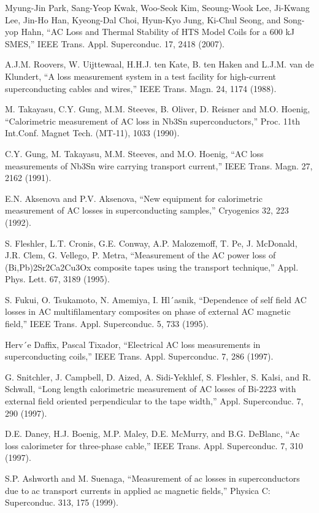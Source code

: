 \noindent [7.85] Myung-Jin Park, Sang-Yeop Kwak, Woo-Seok Kim, Seoung-Wook Lee, Ji-Kwang Lee, Jin-Ho Han, Kyeong-Dal Choi, Hyun-Kyo Jung, Ki-Chul Seong, and Song-yop Hahn,
 ``AC Loss and Thermal Stability of HTS Model Coils for a 600 kJ SMES,” IEEE Trans. Appl. Superconduc. 17, 2418 (2007).

\noindent [7.86] A.J.M. Roovers, W. Uijttewaal, H.H.J. ten Kate, B. ten Haken and L.J.M. van de Klundert, 
``A loss measurement system in a test facility for high-current superconducting cables and wires,” IEEE Trans. Magn. 24, 1174 (1988).

\noindent [7.87] M. Takayasu, C.Y. Gung, M.M. Steeves, B. Oliver, D. Reisner and M.O. Hoenig, 
``Calorimetric measurement of AC loss in Nb3Sn superconductors,” Proc. 11th Int.Conf. Magnet Tech. (MT-11), 1033 (1990).

\noindent [7.88] C.Y. Gung, M. Takayasu, M.M. Steeves, and M.O. Hoenig, ``AC loss measurements
of Nb3Sn wire carrying transport current,” IEEE Trans. Magn. 27, 2162
(1991).

\noindent [7.89] E.N. Aksenova and P.V. Aksenova, ``New equipment for calorimetric measurement
of AC losses in superconducting samples,” Cryogenics 32, 223 (1992).

\noindent [7.90] S. Fleshler, L.T. Cronis, G.E. Conway, A.P. Malozemoff, T. Pe, J. McDonald,
J.R. Clem, G. Vellego, P. Metra, ``Measurement of the AC power loss of
(Bi,Pb)2Sr2Ca2Cu3Ox composite tapes using the transport technique,” Appl.
Phys. Lett. 67, 3189 (1995).

\noindent [7.91] S. Fukui, O. Tsukamoto, N. Amemiya, I. Hl´asnik, ``Dependence of self field AC
losses in AC multifilamentary composites on phase of external AC magnetic field,”
IEEE Trans. Appl. Superconduc. 5, 733 (1995).

\noindent [7.92] Herv´e Daffix, Pascal Tixador, ``Electrical AC loss measurements in superconducting
coils,” IEEE Trans. Appl. Superconduc. 7, 286 (1997).

\noindent [7.93] G. Snitchler, J. Campbell, D. Aized, A. Sidi-Yekhlef, S. Fleshler, S. Kalsi, and
R. Schwall, ``Long length calorimetric measurement of AC losses of Bi-2223 with
external field oriented perpendicular to the tape width,” Appl. Superconduc. 7,
290 (1997).

\noindent [7.94] D.E. Daney, H.J. Boenig, M.P. Maley, D.E. McMurry, and B.G. DeBlanc, ``Ac
loss calorimeter for three-phase cable,” IEEE Trans. Appl. Superconduc. 7, 310
(1997).

\noindent [7.95] S.P. Ashworth and M. Suenaga, ``Measurement of ac losses in superconductors due
to ac transport currents in applied ac magnetic fields,” Physica C: Superconduc.
313, 175 (1999).

